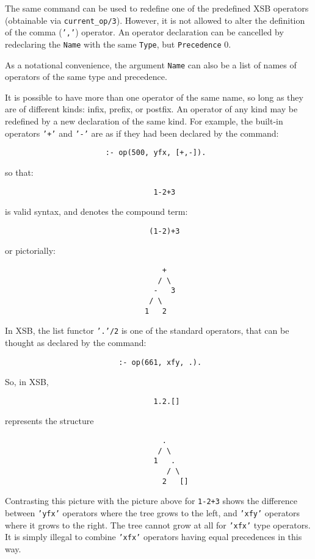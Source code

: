 \begin{description}
\end{description}
%
The same command can be used to redefine one of the predefined XSB
operators (obtainable via {\tt current\_op/3}).  However, it is not
allowed to alter the definition of the comma ({\tt ','}) operator.  An
operator declaration can be cancelled by redeclaring the {\tt Name}
with the same {\tt Type}, but {\tt Precedence} 0.

As a notational convenience, the argument {\tt Name} can also be a list of
names of operators of the same type and precedence.

It is possible to have more than one operator of the same name, so
long as they are of different kinds: infix, prefix, or postfix.  An
operator of any kind may be redefined by a new declaration of the same
kind.  For example, the built-in operators {\tt '+'} and {\tt '-'} are
as if they had been declared by the command:
\begin{verbatim}
                       :- op(500, yfx, [+,-]).
\end{verbatim}
so that:
\begin{verbatim}
                                  1-2+3
\end{verbatim}
is valid syntax, and denotes the compound term:
\begin{verbatim}
                                 (1-2)+3
\end{verbatim}
or pictorially:
\begin{verbatim}
                                    +
                                   / \
                                  -   3
                                 / \
                                1   2
\end{verbatim}

In XSB, the list functor {\tt '.'/2} is one of the standard operators,
that can be thought as declared by the command:
\begin{verbatim}
                          :- op(661, xfy, .).
\end{verbatim}
So, in XSB,
\begin{verbatim}
                                  1.2.[]
\end{verbatim}
represents the structure
\begin{verbatim}
                                    .
                                   / \
                                  1   .
                                     / \
                                    2   []
\end{verbatim}
Contrasting this picture with the picture above for {\tt 1-2+3} shows
the difference between {\tt 'yfx'} operators where the tree grows to
the left, and {\tt 'xfy'} operators where it grows to the right.  The
tree cannot grow at all for {\tt 'xfx'} type operators.  It is simply
illegal to combine {\tt 'xfx'} operators having equal precedences in
this way.

